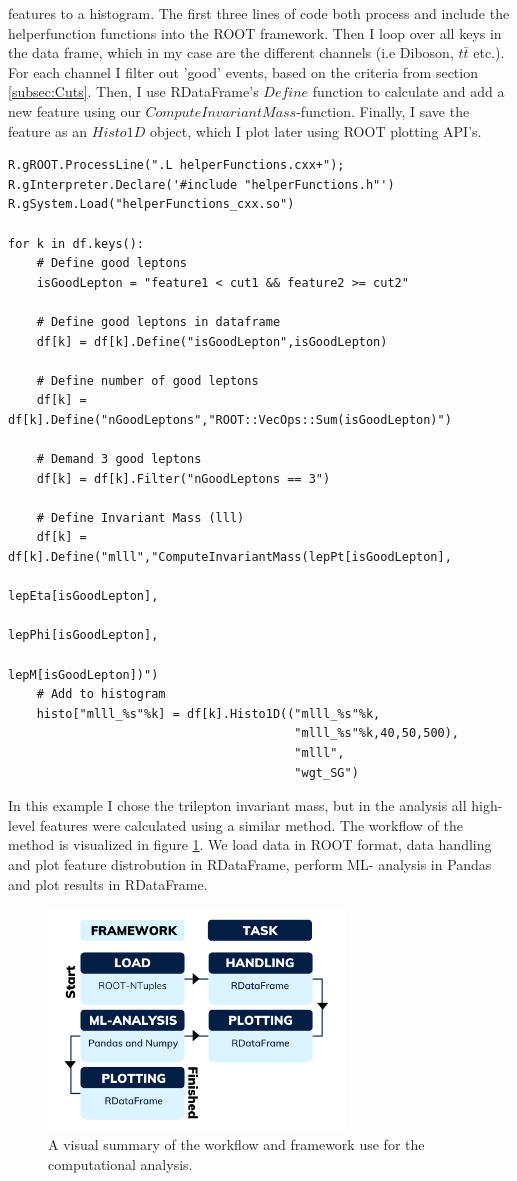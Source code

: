 features to a histogram. The first three lines of code both process and include the helperfunction 
functions into the ROOT framework. Then I loop over all keys in the data frame, which in my case
are the different channels (i.e Diboson, $t\bar{t}$ etc.). For each channel I filter out 'good' events,
based on the criteria from section \ref{subsec:Cuts}. Then, I use RDataFrame's $Define$ function to calculate
and add a new feature using our $ComputeInvariantMass$-function. Finally, I save the feature as 
an $Histo1D$ object, which I plot later using ROOT plotting \ac{API}'s.
\lstset{style=Python}
\begin{lstlisting}[caption={Python-file for calling dataframe and calculating $M_{lll}$.},captionpos=b, label={lst:df_mlll}]
R.gROOT.ProcessLine(".L helperFunctions.cxx+");
R.gInterpreter.Declare('#include "helperFunctions.h"') 
R.gSystem.Load("helperFunctions_cxx.so")

for k in df.keys():
    # Define good leptons
    isGoodLepton = "feature1 < cut1 && feature2 >= cut2"

    # Define good leptons in dataframe
    df[k] = df[k].Define("isGoodLepton",isGoodLepton)

    # Define number of good leptons
    df[k] = df[k].Define("nGoodLeptons","ROOT::VecOps::Sum(isGoodLepton)")

    # Demand 3 good leptons 
    df[k] = df[k].Filter("nGoodLeptons == 3")

    # Define Invariant Mass (lll)
    df[k] = df[k].Define("mlll","ComputeInvariantMass(lepPt[isGoodLepton], 
                                                      lepEta[isGoodLepton], 
                                                      lepPhi[isGoodLepton], 
                                                      lepM[isGoodLepton])")
    # Add to histogram
    histo["mlll_%s"%k] = df[k].Histo1D(("mlll_%s"%k,
                                        "mlll_%s"%k,40,50,500),
                                        "mlll",
                                        "wgt_SG")     
\end{lstlisting}
In this example I chose the trilepton invariant mass, but in the analysis all high-level features were
calculated using a similar method. The workflow of the method is visualized in figure \ref{fig:WF}. We
load data in ROOT format, data handling and plot feature distrobution  in RDataFrame, perform \ac{ML}-
analysis in Pandas and plot results in RDataFrame.
\begin{figure}
    \centering
    \includegraphics[width=0.7\textwidth]{Figures/Illustrations/TaskFlow.png}
    \caption{A visual summary of the workflow and framework use for the 
    computational analysis. }
    \label{fig:WF}
\end{figure}

